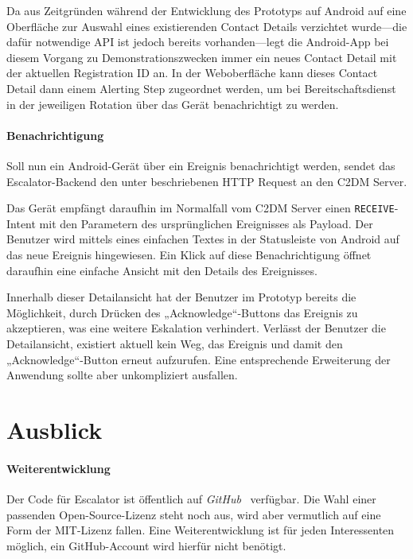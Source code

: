 \documentclass[11pt,utf8,notoc,bibnum,german,final]{zihpub}
\begin{document}
Da aus Zeitgründen während der Entwicklung des Prototyps auf Android auf eine
Oberfläche zur Auswahl eines existierenden Contact Details verzichtet wurde—die
dafür notwendige API ist jedoch bereits vorhanden—legt die Android-App bei
diesem Vorgang zu Demonstrationszwecken immer ein neues Contact Detail mit der
aktuellen Registration ID an. In der Weboberfläche kann dieses Contact Detail
dann einem Alerting Step zugeordnet werden, um bei Bereitschaftsdienst in der
jeweiligen Rotation über das Gerät benachrichtigt zu werden.

\paragraph{Benachrichtigung}

Soll nun ein Android-Gerät über ein Ereignis benachrichtigt werden, sendet das
Escalator-Backend den unter \cite{c2dm-server} beschriebenen HTTP Request an
den C2DM Server.

Das Gerät empfängt daraufhin im Normalfall vom C2DM Server einen
\texttt{RECEIVE}-Intent mit den Parametern des ursprünglichen Ereignisses als
Payload. Der Benutzer wird mittels eines einfachen Textes in der Statusleiste
von Android auf das neue Ereignis hingewiesen. Ein Klick auf diese
Benachrichtigung öffnet daraufhin eine einfache Ansicht mit den Details des
Ereignisses.

Innerhalb dieser Detailansicht hat der Benutzer im Prototyp bereits die
Möglichkeit, durch Drücken des „Acknowledge“-Buttons das Ereignis zu
akzeptieren, was eine weitere Eskalation verhindert. Verlässt der Benutzer die
Detailansicht, existiert aktuell kein Weg, das Ereignis und damit den
„Acknowledge“-Button erneut aufzurufen. Eine entsprechende Erweiterung der
Anwendung sollte aber unkompliziert ausfallen.


\section{Ausblick}


\paragraph{Weiterentwicklung}

Der Code für Escalator ist öffentlich auf \emph{GitHub}~\cite{escalator-github}
verfügbar. Die Wahl einer passenden Open-Source-Lizenz steht noch aus, wird
aber vermutlich auf eine Form der MIT-Lizenz fallen. Eine Weiterentwicklung ist
für jeden Interessenten möglich, ein GitHub-Account wird hierfür nicht benötigt.
\end{document}
